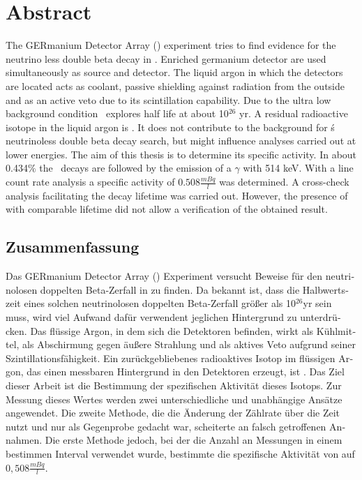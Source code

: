 \documentclass[encoding=utf8,british]{tumphthesis}
\begin{document}



\chapter*{Abstract}
The GERmanium Detector Array (\gerda) experiment tries to find evidence for the neutrino less double beta decay in .
Enriched germanium detector are used simultaneously as source and detector.
The liquid argon in which the detectors are located acts as coolant, passive shielding against radiation from the outside and as an active veto due to its scintillation capability.
Due to the ultra low background condition \gerda\ explores half life at about 10$^{26}$ yr.
A residual radioactive isotope in the liquid argon is .
It does not contribute to the background for \gerda\'s neutrinoless double beta decay search, but might influence analyses carried out at lower energies.
The aim of this thesis is to determine its specific activity.
In about 0.434$\%$ the \Kr\ decays are followed by the emission of a $\gamma$ with 514 keV.
With a line count rate analysis a specific activity of $0.508\frac{\unit{mBq}}{\unit{l}}$ was determined.
A cross-check analysis facilitating the decay lifetime was carried out.
However, the presence of  with comparable lifetime did not allow a verification of the obtained result.


\begin{otherlanguage}{ngerman}
\chapter*{Zusammenfassung}
Das GERmanium Detector Array (\gerda) Experiment versucht Beweise für den neutrinolosen doppelten Beta-Zerfall in  zu finden.
Da bekannt ist, dass die Halbwertszeit eines solchen neutrinolosen doppelten Beta-Zerfall größer als 10$^{26}$yr sein muss, wird viel Aufwand dafür verwendent jeglichen Hintergrund zu unterdrücken.
Das flüssige Argon, in dem sich die Detektoren befinden, wirkt als Kühlmittel, als Abschirmung gegen äußere Strahlung und als aktives Veto aufgrund seiner Szintillationsfähigkeit.
Ein zurückgebliebenes radioaktives Isotop im flüssigen Argon, das einen messbaren Hintergrund in den Detektoren erzeugt, ist .
Das Ziel dieser Arbeit ist die Bestimmung der spezifischen Aktivität dieses Isotops.
Zur Messung dieses Wertes werden zwei unterschiedliche und unabhängige Ansätze angewendet.
Die zweite Methode, die die Änderung der Zählrate über die Zeit nutzt und nur als Gegenprobe gedacht war, scheiterte an falsch getroffenen Annahmen.
Die erste Methode jedoch, bei der die Anzahl an Messungen in einem bestimmen Interval verwendet wurde, bestimmte die spezifische Aktivität von  auf $0,508\frac{mBq} {\unit{l}}$.
\end{otherlanguage}
\end{document}

